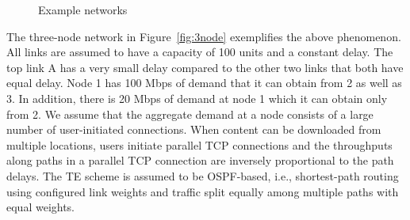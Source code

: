 \begin{figure}[tbh]
  \begin{center}
  \end{center} 
  \caption{Example networks}
\end{figure}





The three-node network in Figure~\ref{fig:3node} exemplifies the above phenomenon. All links are assumed to have a capacity of 100 units and a constant delay. The top link A has a very small delay compared to the other two links that both have equal delay. Node 1 has 100 Mbps of demand that it can obtain from 2 as well as 3. In addition, there is 20 Mbps of demand at node 1 which it can obtain only from 2.  We assume that the aggregate demand at a node consists of a large number of user-initiated connections. When content can be downloaded from multiple locations, users initiate parallel TCP connections and the throughputs along paths in a parallel TCP connection are inversely proportional to the path delays. The TE scheme is assumed to be OSPF-based, i.e., shortest-path routing using configured link weights and traffic split equally among multiple paths with equal weights.


